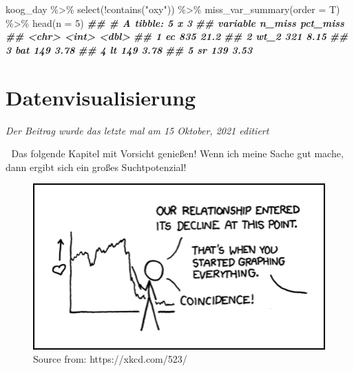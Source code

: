 \documentclass[
]{article}
\newenvironment{Shaded}{\begin{snugshade}}{\end{snugshade}}
\newcommand{\AttributeTok}[1]{\textcolor[rgb]{0.77,0.63,0.00}{#1}}
\newcommand{\DecValTok}[1]{\textcolor[rgb]{0.00,0.00,0.81}{#1}}
\newcommand{\DocumentationTok}[1]{\textcolor[rgb]{0.56,0.35,0.01}{\textbf{\textit{#1}}}}
\newcommand{\FunctionTok}[1]{\textcolor[rgb]{0.00,0.00,0.00}{#1}}
\newcommand{\NormalTok}[1]{#1}
\newcommand{\SpecialCharTok}[1]{\textcolor[rgb]{0.00,0.00,0.00}{#1}}
\newcommand{\StringTok}[1]{\textcolor[rgb]{0.31,0.60,0.02}{#1}}
\begin{document}
\begin{Shaded}
\begin{Highlighting}[]
\NormalTok{koog\_day }\SpecialCharTok{\%\textgreater{}\%}
  \FunctionTok{select}\NormalTok{(}\SpecialCharTok{!}\FunctionTok{contains}\NormalTok{(}\StringTok{"oxy"}\NormalTok{)) }\SpecialCharTok{\%\textgreater{}\%}
  \FunctionTok{miss\_var\_summary}\NormalTok{(}\AttributeTok{order =}\NormalTok{ T) }\SpecialCharTok{\%\textgreater{}\%}
  \FunctionTok{head}\NormalTok{(}\AttributeTok{n =} \DecValTok{5}\NormalTok{)}
\DocumentationTok{\#\# \# A tibble: 5 x 3}
\DocumentationTok{\#\#   variable n\_miss pct\_miss}
\DocumentationTok{\#\#   \textless{}chr\textgreater{}     \textless{}int\textgreater{}    \textless{}dbl\textgreater{}}
\DocumentationTok{\#\# 1 ec          835    21.2 }
\DocumentationTok{\#\# 2 wt\_2        321     8.15}
\DocumentationTok{\#\# 3 bat         149     3.78}
\DocumentationTok{\#\# 4 lt          149     3.78}
\DocumentationTok{\#\# 5 sr          139     3.53}
\end{Highlighting}
\end{Shaded}

\hypertarget{datenvisualisierung}{%
\section{Datenvisualisierung}\label{datenvisualisierung}}

\emph{Der Beitrag wurde das letzte mal am 15 Oktober, 2021 editiert}

🚨 Das folgende Kapitel mit Vorsicht genießen! Wenn ich meine Sache gut mache, dann ergibt sich ein großes Suchtpotenzial!

\begin{figure}

{\centering \includegraphics[width=1\linewidth]{images/050} 

}

\caption{Source from: https://xkcd.com/523/}\label{fig:unnamed-chunk-169}
\end{figure}
\end{document}
